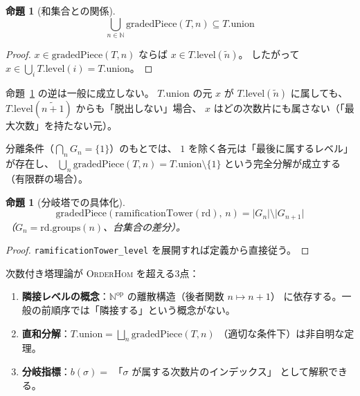 \documentclass[a4paper,11pt]{ltjsarticle}
\theoremstyle{definition}
\theoremstyle{plain}
\newtheorem{proposition}[definition]{命題}
\theoremstyle{remark}
\begin{document}
\begin{proposition}[和集合との関係]\label{prop:union-graded}
  \[
    \bigcup_{n \in \mathbb{N}} \mathrm{gradedPiece}(T,n) \subseteq T.\mathrm{union}
  \]
\end{proposition}

\begin{proof}
  $x \in \mathrm{gradedPiece}(T,n)$ ならば $x \in T.\mathrm{level}(\tilde{n})$。
  したがって $x \in \bigcup_i T.\mathrm{level}(i) = T.\mathrm{union}$。
\end{proof}

\begin{mathinsight}
命題~\ref{prop:union-graded} の逆は一般に成立しない。
$T.\mathrm{union}$ の元 $x$ が $T.\mathrm{level}(\tilde{n})$ に属しても、
$T.\mathrm{level}(\widetilde{n+1})$ からも「脱出しない」場合、
$x$ はどの次数片にも属さない（「最大次数」を持たない元）。

分離条件（$\bigcap_n G_n = \{1\}$）のもとでは、
$1$ を除く各元は「最後に属するレベル」が存在し、
$\bigcup_n \mathrm{gradedPiece}(T,n) = T.\mathrm{union} \setminus \{1\}$
という完全分解が成立する（有限群の場合）。
\end{mathinsight}

\begin{proposition}[分岐塔での具体化]\label{prop:graded-ramification}
  \[
    \mathrm{gradedPiece}(\mathrm{ramificationTower}(\mathrm{rd}),\,n)
    = \lvert G_n \rvert \setminus \lvert G_{n+1} \rvert
  \]
  （$G_n = \mathrm{rd.groups}(n)$、台集合の差分）。
\end{proposition}

\begin{proof}
  \texttt{ramificationTower\_level} を展開すれば定義から直接従う。
\end{proof}

\begin{mathinsight}
次数付き塔理論が \textsc{OrderHom} を超える3点：
\begin{enumerate}
  \item \textbf{隣接レベルの概念}：$\mathbb{N}^{\mathrm{op}}$ の離散構造（後者関数 $n \mapsto n+1$）
    に依存する。一般の前順序では「隣接する」という概念がない。
  \item \textbf{直和分解}：$T.\mathrm{union} = \bigsqcup_n \mathrm{gradedPiece}(T,n)$
    （適切な条件下）は非自明な定理。
  \item \textbf{分岐指標}：$b(\sigma) = $ 「$\sigma$ が属する次数片のインデックス」
    として解釈できる。
\end{enumerate}
\end{mathinsight}
\end{document}
